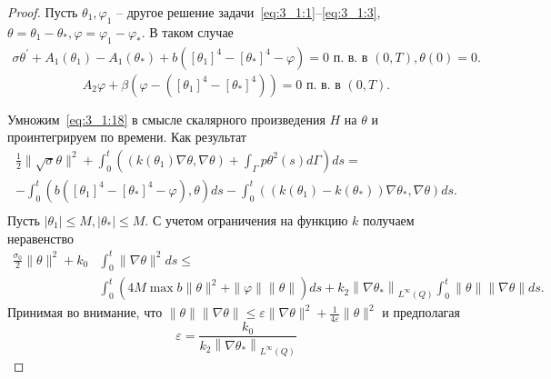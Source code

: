 \begin{proof}
    Пусть $\theta_{1}, \varphi_{1}$ -- другое решение
    задачи~\eqref{eq:3_1:1}--\eqref{eq:3_1:3},
    $\theta=\theta_{1}-\theta_{*}, \varphi=\varphi_{ 1}-\varphi_{*}$.
    В таком случае
    \begin{equation}
        \label{eq:3_1:18}
        \begin{gathered}
            \sigma \theta^{\prime}+A_{1}\left(\theta_{1}\right)
            -A_{1}\left(\theta_{*}\right)+b\left(\left[\theta_{1}\right]^{4}-
            \left[\theta_{*}\right]^{4}-\varphi\right)=0
            \text { п. в. в }(0, T), \theta(0)=0.
        \end{gathered}
    \end{equation}
    \begin{equation}
        \label{eq:3_1:19}
        A_{2} \varphi+\beta\left(\varphi-\left(\left[\theta_{1}\right]^{4}
        -\left[\theta_{*}\right]^{4}\right)\right)=0
        \text { п. в. в }(0, T).
    \end{equation}

    Умножим~\eqref{eq:3_1:18} в смысле скалярного произведения
    $H$ на $\theta$ и проинтегрируем по времени.
    Как результат
    \begin{gather*}
        \frac{1}{2}\|\sqrt{\sigma} \theta\|^{2}+
        \int_{0}^{t}\left(\left(k\left(\theta_{1}\right) \nabla \theta,
        \nabla \theta\right)+\int_{\Gamma} p \theta^{2}(s) d \Gamma\right) d s=\\
        -\int_{0}^{t}\left(b\left(\left[\theta_{1}\right]^{4}-
        \left[\theta_{*}\right]^{4}-\varphi\right),
        \theta\right) d s-\int_{0}^{t}\left(\left(k\left(\theta_{1}\right)
        -k\left(\theta_{*}\right)\right)
        \nabla \theta_{*}, \nabla \theta\right) d s.\\
    \end{gather*}
    Пусть $\left|\theta_{1}\right| \leq M,\left|\theta_{*}\right| \leq M$.
    С учетом ограничения на функцию $k$ получаем неравенство
    \begin{equation}
        \label{eq:3_1:20}
        \begin{aligned}
            \frac{\sigma_{0}}{2}\|\theta\|^{2}+k_{0}
            & \int_{0}^{t}\|\nabla \theta\|^{2} d s \leq \\
            & \int_{0}^{t}\left(4 M \max b\|\theta\|^{2}
            +\|\varphi\|\|\theta\|\right) d s
            +k_{2}\left\|\nabla \theta_{*}\right\|_{L^{\infty}(Q)}
            \int_{0}^{t}\|\theta\|\|\nabla \theta\| d s.
        \end{aligned}
    \end{equation}
    Принимая во внимание, что
    $\|\theta\|\|\nabla \theta\| \leq \varepsilon\|\nabla \theta\|^{2}+
    \frac{1}{4 \varepsilon}\|\theta\|^{2}$
    и предполагая
    \[
        \varepsilon=\frac{k_{0}}{k_{2}\left\|\nabla \theta_{*}\right\|_{L^{\infty}(Q)}}
    \]



\end{proof}
